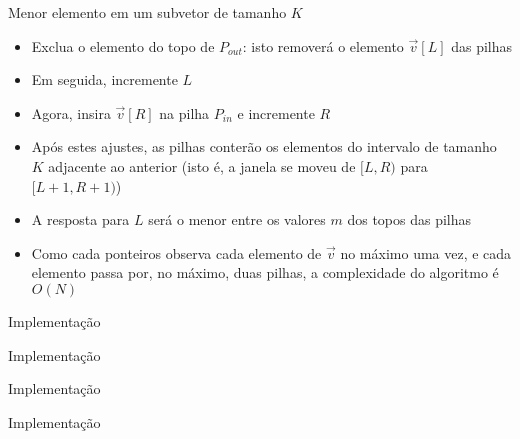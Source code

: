 \begin{frame}[fragile]{Menor elemento em um subvetor de tamanho $K$}

    \begin{itemize}
        \item Exclua o elemento do topo de $P_{out}$: isto removerá o elemento
            $\vec{v}[L]$ das pilhas

        \item Em seguida, incremente $L$

        \item Agora, insira $\vec{v}[R]$ na pilha $P_{in}$  e incremente $R$

        \item Após estes ajustes, as pilhas conterão os elementos do intervalo de tamanho $K$
            adjacente ao anterior (isto é, a janela se moveu de $[L, R)$ para $[L + 1, R + 1)$)

        \item A resposta para $L$ será o menor entre os valores $m$ dos topos das pilhas

        \item Como cada ponteiros observa cada elemento de $\vec{v}$ no máximo uma vez, e cada
            elemento passa por, no máximo, duas pilhas, a complexidade do algoritmo é $O(N)$
    \end{itemize}

\end{frame}



\begin{frame}[fragile]{Implementação}
\end{frame}

\begin{frame}[fragile]{Implementação}
\end{frame}

\begin{frame}[fragile]{Implementação}
\end{frame}

\begin{frame}[fragile]{Implementação}
\end{frame}

